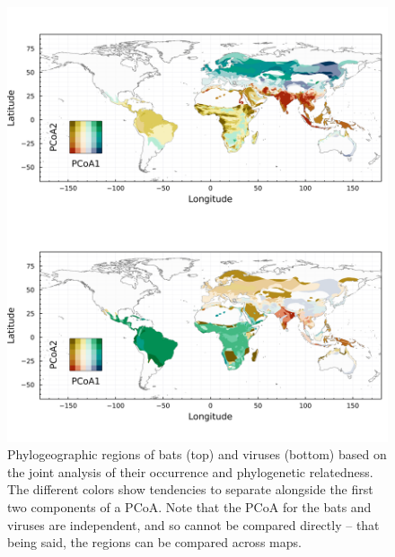 \documentclass[11pt]{article}
\makeatletter
\def\maxwidth{\ifdim\Gin@nat@width>\linewidth\linewidth
\else\Gin@nat@width\fi}
\let\Oldincludegraphics\includegraphics
\renewcommand{\includegraphics}[1]{\Oldincludegraphics[width=\maxwidth]{#1}}
\makeatother
\begin{document}
\begin{figure}
\hypertarget{fig:biogeo}{%
\centering
\includegraphics{figures/combined_biogeo.png}
\caption{Phylogeographic regions of bats (top) and viruses (bottom)
based on the joint analysis of their occurrence and phylogenetic
relatedness. The different colors show tendencies to separate alongside
the first two components of a PCoA. Note that the PCoA for the bats and
viruses are independent, and so cannot be compared directly -- that
being said, the regions can be compared across maps.}\label{fig:biogeo}
}
\end{figure}
\end{document}
